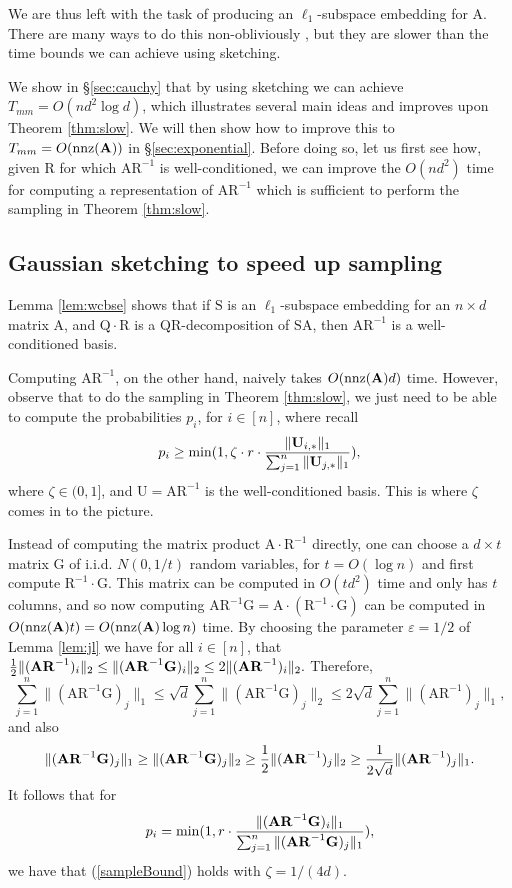 \documentclass[11pt]{article}
\newcommand{\mat}[1]{{\ensuremath{\bm{\mathrm{#1}}}}}
\def\matA{\mat{A}}
\def\matG{\mat{G}}
\def\matQ{\mat{Q}}
\def\matR{\mat{R}}
\def\matS{\mat{S}}
\def\matU{\mat{U}}
\def\nnz{{ \rm nnz }}
\def\frac#1#2{{#1\over #2}}
\newcommand{\eps}{\varepsilon}
\begin{document}
We are thus left with the task of producing an $\ell_1$-subspace embedding for $\matA$. 
There are many ways to do this non-obliviously \cite{l78,s87,blm89,t90,js03}, 
but they are slower than the time bounds we can achieve using
sketching. 

We show in \S\ref{sec:cauchy} that by using sketching we can achieve 
$T_{mm} = O(nd^2 \log d)$, which illustrates several main ideas and improves upon Theorem \ref{thm:slow}. 
We will then show how to improve
this to $T_{mm} = O(\nnz(\matA))$ in \S\ref{sec:exponential}. 
Before doing so, let us first see how, given $\matR$ for which $\matA \matR^{-1}$
is well-conditioned, we can 
improve the $O(nd^2)$ time for computing a representation of 
$\matA \matR^{-1}$ which is sufficient to perform the sampling in Theorem \ref{thm:slow}. 

\subsection{Gaussian sketching to speed up sampling}\label{sec:gaussian}
Lemma \ref{lem:wcbse} shows that if $\matS$ is an $\ell_1$-subspace embedding for an $n \times d$ matrix $\matA$, 
and $\matQ \cdot \matR$ is a QR-decomposition of $\matS \matA$, then $\matA \matR^{-1}$ is a well-conditioned basis.

Computing $\matA \matR^{-1}$, on the other hand, naively takes $O(\nnz(\matA) d)$ time. 
However, observe that to do the sampling
in Theorem \ref{thm:slow}, we just need to be able to compute the probabilities $p_i$, for $i \in [n]$, where recall
\begin{eqnarray}\label{sampleBound}
p_i \geq \min(1, \zeta \cdot r \cdot \frac{\|\matU_{i,*}\|_1}{\sum_{j=1}^n \|\matU_{j,*}\|_1}),
\end{eqnarray}
where $\zeta \in (0,1]$, and $\matU = \matA \matR^{-1}$ 
is the well-conditioned basis. This is where $\zeta$ comes in to the picture.

Instead of computing the matrix product $\matA \cdot \matR^{-1}$ directly, one can choose a $d \times t$ matrix
$\matG$ of i.i.d. $N(0,1/t)$ random variables, for $t = O(\log n)$ 
and first compute $\matR^{-1} \cdot \matG$. This matrix can be 
computed in $O(t d^2)$ time and only has $t$ columns, and so now 
computing $\matA \matR^{-1} \matG = \matA \cdot (\matR^{-1} \cdot \matG)$ 
can be computed in $O(\nnz(\matA) t) = O(\nnz(\matA) \log n)$ time. By choosing
the parameter $\eps = 1/2$ of Lemma \ref{lem:jl} we have
for all $i \in [n]$, that $\frac{1}{2} \|(\matA \matR^{-1})_i\|_2 \leq \|(\matA \matR^{-1} \matG)_i\|_2 
\leq 2 \|(\matA \matR^{-1})_i\|_2.$ Therefore,
$$\sum_{j=1}^n \|(\matA \matR^{-1} \matG)_j\|_1 \leq \sqrt{d} \sum_{j=1}^n \|(\matA \matR^{-1} \matG)_j\|_2 
\leq 2\sqrt{d} \sum_{j=1}^n \|(\matA \matR^{-1})_j\|_1,$$ and
also $$\|(\matA \matR^{-1} \matG)_j\|_1 \geq \|(\matA \matR^{-1} \matG)_j\|_2 
\geq \frac{1}{2} \|(\matA \matR^{-1})_j\|_2 \geq \frac{1}{2\sqrt{d}} \|(\matA \matR^{-1})_j\|_1.$$
It follows that for 
$$p_i = \min(1, r \cdot \frac{\|(\matA \matR^{-1} \matG)_i\|_1}{\sum_{j=1}^n \|(\matA \matR^{-1} \matG)_j\|_1} ),$$
we have that (\ref{sampleBound}) holds with $\zeta = 1/(4d)$. 
\end{document}
